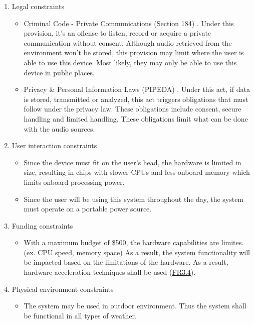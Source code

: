 \documentclass[12pt]{article}
\theoremstyle{definition}
\begin{document}
\begin{enumerate}
  \item Legal constraints
  \begin{itemize}
    \item Criminal Code - Private Communications (Section 184)
    \cite{CriminalCode184}. Under this provision, it's an offense to listen,
    record or acquire a private communication without consent.
    Although audio retrieved from the environment won't be stored, this
    provision may limit where the user is able to use this device.
    Most likely, they may only be able to use this device in public places.
    \item Privacy \& Personal Information Laws (PIPEDA) \cite{PIPEDA2000}.
    Under this act, if data is stored, transmitted or analyzed, this act
    triggers obligations that must follow under the privacy law. 
    These obligations include consent, secure handling and limited handling.
    These obligations limit what can be done with the audio sources.
  \end{itemize}

  \item User interaction constraints
  \begin{itemize}
    \item Since the device must fit on the user's head, the hardware is limited
    in size, resulting in chips with slower CPUs and less onboard memory which
    limits onboard processing power. 
    \item Since the user will be using this system throughout the day, the
    system must operate on a portable power source.
  \end{itemize}

  \item Funding constraints
  \begin{itemize}
    \item With a maximum budget of \$500, the hardware capabilities are limites.
    (ex. CPU speed, memory space)
    As a result, the system functionality will be impacted based on the
    limitations of the hardware. As a result, hardware acceleration techniques
    shall be used (\hyperref[FR3_4]{FR3.4}).
  \end{itemize}

  \item Physical environment constraints
  \begin{itemize}
    \item The system may be used in outdoor environment. Thus the system shall
    be functional in all types of weather.
  \end{itemize}
\end{enumerate}
\end{document}
